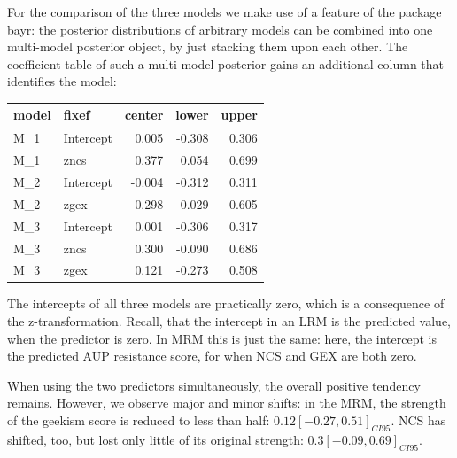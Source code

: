 \documentclass[]{svmono}
\newenvironment{Shaded}{\begin{snugshade}}{\end{snugshade}}
\newcommand{\KeywordTok}[1]{\textcolor[rgb]{0.13,0.29,0.53}{\textbf{#1}}}
\newcommand{\DecValTok}[1]{\textcolor[rgb]{0.00,0.00,0.81}{#1}}
\newcommand{\StringTok}[1]{\textcolor[rgb]{0.31,0.60,0.02}{#1}}
\newcommand{\OperatorTok}[1]{\textcolor[rgb]{0.81,0.36,0.00}{\textbf{#1}}}
\newcommand{\NormalTok}[1]{#1}
\begin{document}
For the comparison of the three models we make use of a feature of the
package bayr: the posterior distributions of arbitrary models can be
combined into one multi-model posterior object, by just stacking them
upon each other. The coefficient table of such a multi-model posterior
gains an additional column that identifies the model:

\begin{Shaded}
\end{Shaded}

\begin{longtable}[]{@{}llrrr@{}}
\toprule
model & fixef & center & lower & upper\tabularnewline
\midrule
\endhead
M\_1 & Intercept & 0.005 & -0.308 & 0.306\tabularnewline
M\_1 & zncs & 0.377 & 0.054 & 0.699\tabularnewline
M\_2 & Intercept & -0.004 & -0.312 & 0.311\tabularnewline
M\_2 & zgex & 0.298 & -0.029 & 0.605\tabularnewline
M\_3 & Intercept & 0.001 & -0.306 & 0.317\tabularnewline
M\_3 & zncs & 0.300 & -0.090 & 0.686\tabularnewline
M\_3 & zgex & 0.121 & -0.273 & 0.508\tabularnewline
\bottomrule
\end{longtable}

The intercepts of all three models are practically zero, which is a
consequence of the z-transformation. Recall, that the intercept in an
LRM is the predicted value, when the predictor is zero. In MRM this is
just the same: here, the intercept is the predicted AUP resistance
score, for when NCS and GEX are both zero.

When using the two predictors simultaneously, the overall positive
tendency remains. However, we observe major and minor shifts: in the
MRM, the strength of the geekism score is reduced to less than half:
\(0.12 [-0.27, 0.51]_{CI95}\). NCS has shifted, too, but lost only
little of its original strength: \(0.3 [-0.09, 0.69]_{CI95}\).
\end{document}

